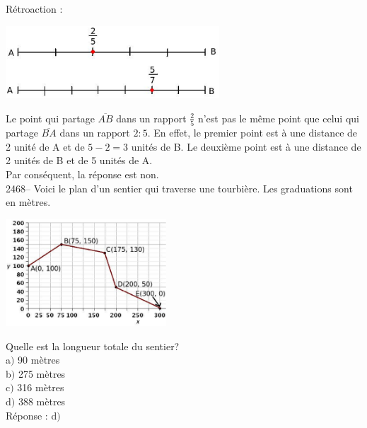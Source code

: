 \documentclass[letterpaper, 12pt]{article}
\begin{document}
R\'etroaction :
\begin{center}
 \includegraphics[width=8cm,bb=14 14 517 215]{Q2467.eps}
\end{center}
Le point qui partage $\overline{AB}$ dans un rapport $\frac{2}{5}$ n'est pas le m\^eme point que celui qui partage $\overline{BA}$ dans un rapport $2:5$. En effet, le premier point est \`a une distance de 2 unit\'e de A et de $5-2=3$ unit\'es de B. Le deuxi\`eme point est \`a une distance de 2 unit\'es de B et de 5 unit\'es de A.\\
Par cons\'equent, la r\'eponse est non.\\

2468-- Voici le plan d'un sentier qui traverse une tourbi\`ere. Les graduations sont en m\`etres. \\
\begin{center}
 \includegraphics[width=6cm,bb=14 14 531 362]{Q2468.eps}
\end{center}
Quelle est la longueur totale du sentier?\\

a$)$ 90 m\`etres\\
b$)$ 275 m\`etres\\
c$)$ 316 m\`etres\\
d$)$ 388 m\`etres\\

R\'eponse : d$)$\\
\end{document}
